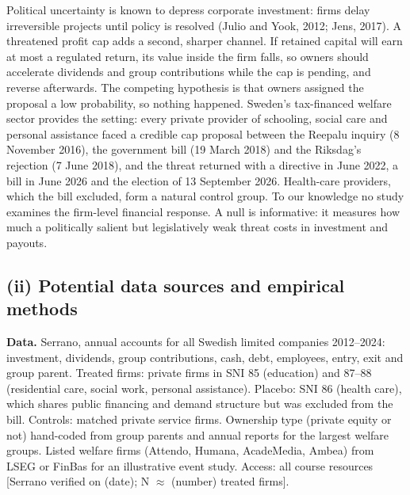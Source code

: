 \documentclass[12pt,a4paper]{article}
\begin{document}
Political uncertainty is known to depress corporate investment: firms delay irreversible projects until policy is resolved (Julio and Yook, 2012; Jens, 2017). A threatened profit cap adds a second, sharper channel. If retained capital will earn at most a regulated return, its value inside the firm falls, so owners should accelerate dividends and group contributions while the cap is pending, and reverse afterwards. The competing hypothesis is that owners assigned the proposal a low probability, so nothing happened. Sweden's tax-financed welfare sector provides the setting: every private provider of schooling, social care and personal assistance faced a credible cap proposal between the Reepalu inquiry (8 November 2016), the government bill (19 March 2018) and the Riksdag's rejection (7 June 2018), and the threat returned with a directive in June 2022, a bill in June 2026 and the election of 13 September 2026. Health-care providers, which the bill excluded, form a natural control group. To our knowledge no study examines the firm-level financial response. A null is informative: it measures how much a politically salient but legislatively weak threat costs in investment and payouts.

\subsection{(ii) Potential data sources and empirical methods}

\textbf{Data.} Serrano, annual accounts for all Swedish limited companies 2012--2024: investment, dividends, group contributions, cash, debt, employees, entry, exit and group parent. Treated firms: private firms in SNI 85 (education) and 87--88 (residential care, social work, personal assistance). Placebo: SNI 86 (health care), which shares public financing and demand structure but was excluded from the bill. Controls: matched private service firms. Ownership type (private equity or not) hand-coded from group parents and annual reports for the largest welfare groups. Listed welfare firms (Attendo, Humana, AcadeMedia, Ambea) from LSEG or FinBas for an illustrative event study. Access: all course resources [Serrano verified on (date); N $\approx$ (number) treated firms].
\end{document}
